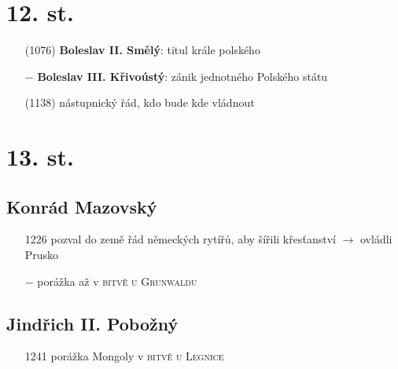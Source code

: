 \documentclass{article}
\begin{document}
\section*{12. st.}
\begin{itemize}
    \vspace{-0.5em}
    \setlength\itemsep{0.15em}
    \item[(1076)] \textbf{Boleslav II. Smělý}: titul krále polského
    \item[$-$] \textbf{Boleslav III. Křivoústý}: zánik jednotného Polského státu
    \item[(1138)] nástupnický řád, kdo bude kde vládnout
\end{itemize}

\section*{13. st.}

\subsection*{Konrád Mazovský}
\begin{itemize}
    \vspace{-0.5em}
    \setlength\itemsep{0.15em}
    \item[1226] pozval do země řád německých rytířů, aby šířili křesťanství $\rightarrow$ ovládli Prusko
    \item[$-$] porážka až v \textsc{bitvě u Grunwaldu}
\end{itemize}

\subsection*{Jindřich II. Pobožný}
\begin{itemize}
    \vspace{-0.5em}
    \setlength\itemsep{0.15em}
    \item[1241] porážka Mongoly v \textsc{bitvě u Legnice}
\end{itemize}
\end{document}
